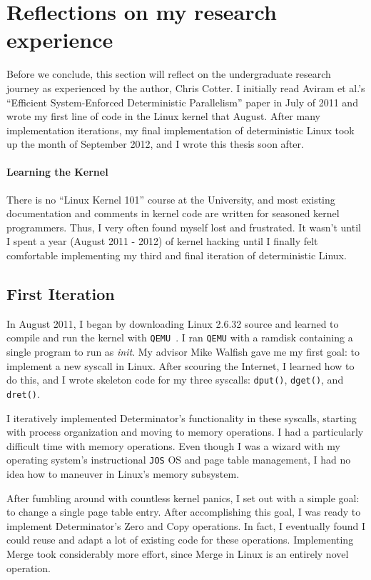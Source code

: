 
\section{Reflections on my research experience}
Before we conclude, this section will reflect on the undergraduate research
journey as experienced by the author, Chris Cotter. I initially read
Aviram et al.'s ``Efficient System-Enforced Deterministic Parallelism'' paper
in July of 2011 and wrote my first line of code in the Linux kernel that August.
After many implementation iterations, my final implementation of deterministic
Linux took up the month of September 2012, and I wrote this thesis soon after.

\paragraph{Learning the Kernel}
There is no ``Linux Kernel 101'' course at the University, and most existing
documentation and comments in kernel code are written for seasoned kernel
programmers. Thus, I very often found myself lost and frustrated. It wasn't
until I spent a year (August 2011 - 2012) of kernel hacking until I finally
felt comfortable implementing my third and final iteration of deterministic
Linux.

\subsection{First Iteration}
In August 2011, I began by downloading Linux 2.6.32 source and learned to
compile and run the kernel with {\tt QEMU}~\cite{qemu}. I ran
{\tt QEMU} with a ramdisk containing a single program to run as \emph{init}.
My advisor Mike Walfish gave me my first goal: to implement a new syscall
in Linux. After scouring the Internet, I learned how to do this, and I wrote
skeleton code for my three syscalls: {\tt dput()}, {\tt dget()}, and
{\tt dret()}.

I iteratively implemented Determinator's functionality in these syscalls,
starting with process organization and moving to memory operations. I had a
particularly difficult time with memory operations. Even though I was a wizard
with my operating system's instructional {\tt JOS} OS and page table management,
I had no idea how to maneuver in Linux's memory subsystem.

After fumbling around with countless kernel panics, I set out with a simple
goal: to change a single page table entry. After accomplishing this goal,
I was ready to implement Determinator's Zero and Copy operations. In fact, I
eventually found I could reuse and adapt a lot of existing code for these
operations. Implementing Merge took considerably more effort, since Merge in
Linux is an entirely novel operation.


